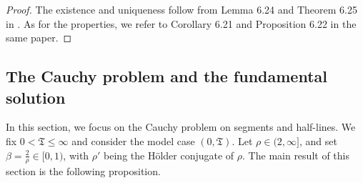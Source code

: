 \documentclass[12pt, letterpaper]{amsart}
\theoremstyle{definition}
\theoremstyle{remark}
\numberwithin{equation}{section}
\begin{document}
\begin{proof}
    The existence and uniqueness follow from Lemma 6.24 and Theorem 6.25 in \cite{auscher2024fundamental}. As for the properties, we refer to Corollary 6.21 and Proposition 6.22 in the same paper.
\end{proof}

\subsection{The Cauchy problem and the fundamental solution}
In this section, we focus on the Cauchy problem on segments and half-lines. We fix $0 < \mathfrak{T} \le \infty$ and consider the model case $(0, \mathfrak{T})$. Let $\rho \in (2, \infty]$, and set $\beta = \frac{2}{\rho} \in [0, 1)$, with $\rho'$ being the H\"older conjugate of $\rho$. The main result of this section is the following proposition.
\end{document}
